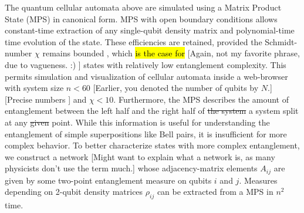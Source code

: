 \documentclass[11pt]{article}
\newcommand{\nicole}[1]{{\color{Green}#1}}
\begin{document}
\begin{multicols}{2}
The quantum cellular automata above are simulated using a Matrix Product State (MPS) in canonical form. MPS with open boundary conditions allows constant-time extraction of any single-qubit density matrix and polynomial-time time evolution of the state. These efficiencies are retained\nicole{,} provided the Schmidt-number $\chi$ remains bounded \cite{Orus}, which \hl{is the case for} \nicole{[Again, not my favorite phrase, due to vagueness. :) ]} states with relatively low entanglement complexity. This permits simulation and visualization of cellular automata inside a web-browser with system size $n < 60$
\nicole{[Earlier, you denoted the number of qubits by $N$.]}
\nicole{[Precise numbers \checkmark]}
 and $\chi < 10$. Furthermore, the MPS describes the amount of entanglement between the left half and the right half of \sout{the system} \nicole{a system split} at any \sout{given} point. While this information is useful for understanding the entanglement of simple superpositions like Bell pairs, it is insufficient for more complex behavior. To better characterize states with more complex entanglement, we construct a network 
 \nicole{[Might want to explain what a network is, as many physicists don't use the term much.]}
 whose adjacency\nicole{-}matrix elements $A_{ij}$ are given by some two-point entanglement measure on qubits $i$ and $j$. Measures depending on 2-qubit density matrices $\rho_{ij}$ can be extracted from a MPS in $n^2$ time.


\end{multicols}
\end{document}

